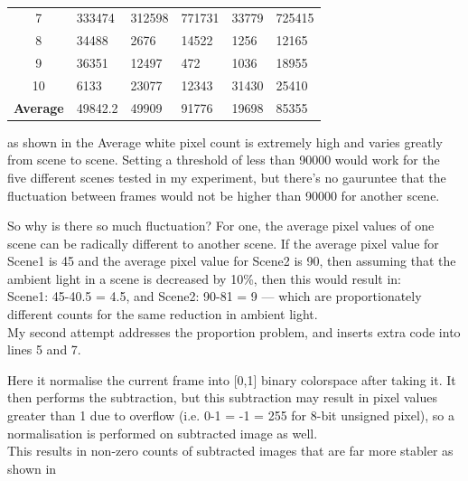 {{\begin{center}
\begin{table}[!htbp]
\begin{center}
\begin{tabular}{| c | l | l | l | l | l | }
7	&333474	&312598	&771731	&33779	&725415\\
8	&34488	&2676	&14522	&1256	&12165\\
9	&36351	&12497	&472	&1036	&18955\\
10	&6133	&23077	&12343	&31430	&25410\\ \hline
\bf Average	&49842.2	&49909	&91776	&19698	&85355\\ \hline
	\end{tabular}
	\end{center}
	\caption{}
	\label{tab:sub1}
\end{table}
\vspace{-20pt}
\end{center}
as shown in  the Average white pixel count is extremely high and varies greatly from scene to scene. Setting a threshold of less than 90000 would work for the five different scenes tested in my experiment, but there’s no gauruntee that the fluctuation between frames would not be higher than 90000 for another scene.

So why is there so much fluctuation? For one, the average pixel values of one scene can be radically different to another scene. If the average pixel value for Scene1 is 45 and the average pixel value for Scene2 is 90, then assuming that the ambient light in a scene is decreased by 10\%, then this would result in:\\
Scene1:  45-40.5 = 4.5, and Scene2: 90-81 = 9 --- which are proportionately different counts for the same reduction in ambient light.\\
 
My second attempt addresses the proportion problem, and inserts extra code into lines 5 and 7.
\begin{frame}{}

\end{frame}
Here it normalise the current frame into [0,1] binary colorspace after taking it. It then performs the subtraction, but this subtraction may result in pixel values greater than 1 due to overflow (i.e. 0-1 = -1 = 255 for 8-bit unsigned pixel), so a normalisation is performed on subtracted image as well. \\
This results in non-zero counts of subtracted images that are far more stabler as shown in 
\begin{center}
\begin{table}[!htbp]
\centering
\begin{tabular}{| c | l | l | l | l | l | }


\end{tabular}
\end{table}
\end{center}}}
